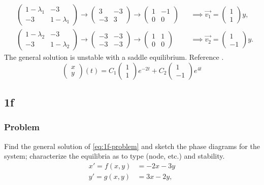 \documentclass[12pt]{article}
\begin{document}
\begin{equation*}
  \begin{aligned}
    &\begin{pmatrix}1-\lambda_1&-3\\-3&1-\lambda_1\end{pmatrix}
    \rightarrow\begin{pmatrix}3&-3\\-3&3\end{pmatrix}
    \rightarrow\begin{pmatrix}1&-1\\0&0\end{pmatrix}
    &&\implies \vec{v_1} = \begin{pmatrix}1\\1\end{pmatrix}y, \\
    &\begin{pmatrix}1-\lambda_2&-3\\-3&1-\lambda_2\end{pmatrix}
    \rightarrow\begin{pmatrix}-3&-3\\-3&-3\end{pmatrix}
    \rightarrow\begin{pmatrix}1&1\\0&0\end{pmatrix}
    &&\implies \vec{v_2} = \begin{pmatrix}1\\-1\end{pmatrix}y.
  \end{aligned}
\end{equation*}
The general solution is unstable with a saddle equilibrium. Reference \todo[figure].
$$\boxed{\begin{pmatrix}x\\y\end{pmatrix}(t)=C_1\begin{pmatrix}1\\1\end{pmatrix}e^{-2t}+C_2\begin{pmatrix}1\\-1\end{pmatrix}e^{4t}}$$

\newpage
\subsection{1f}
\subsubsection*{Problem}
Find the general solution of \cref{eq:1f-problem} and sketch the phase diagrams
for the system; characterize the equilibria as to type (node, etc.) and
stability.
\begin{equation}
  \label{eq:1f-problem}
  \begin{aligned}
    x'=f(x,y)&=-2x-3y\\
    y'=g(x,y)&=3x-2y,\\
  \end{aligned}
\end{equation}
\end{document}
